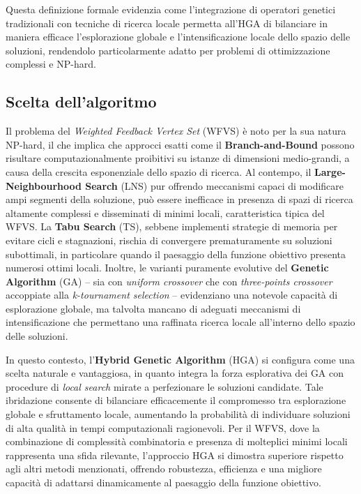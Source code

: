 \documentclass[12pt,a4paper,twoside]{article}
\begin{document}
\bigskip
Questa definizione formale evidenzia come l'integrazione di operatori genetici tradizionali con tecniche di ricerca locale permetta all'HGA di bilanciare in maniera efficace l'esplorazione globale e l'intensificazione locale dello spazio delle soluzioni, rendendolo particolarmente adatto per problemi di ottimizzazione complessi e NP-hard.
\subsection{Scelta dell'algoritmo}
Il problema del \emph{Weighted Feedback Vertex Set} (WFVS) è noto per la sua natura NP-hard, il che implica che approcci esatti come il \textbf{Branch-and-Bound} possono risultare computazionalmente proibitivi su istanze di dimensioni medio-grandi, a causa della crescita esponenziale dello spazio di ricerca. Al contempo, il \textbf{Large-Neighbourhood Search} (LNS) pur offrendo meccanismi capaci di modificare ampi segmenti della soluzione, può essere inefficace in presenza di spazi di ricerca altamente complessi e disseminati di minimi locali, caratteristica tipica del WFVS. La \textbf{Tabu Search} (TS), sebbene implementi strategie di memoria per evitare cicli e stagnazioni, rischia di convergere prematuramente su soluzioni subottimali, in particolare quando il paesaggio della funzione obiettivo presenta numerosi ottimi locali. Inoltre, le varianti puramente evolutive del \textbf{Genetic Algorithm} (GA) – sia con \emph{uniform crossover} che con \emph{three-points crossover} accoppiate alla \emph{k-tournament selection} – evidenziano una notevole capacità di esplorazione globale, ma talvolta mancano di adeguati meccanismi di intensificazione che permettano una raffinata ricerca locale all'interno dello spazio delle soluzioni. 

In questo contesto, l'\textbf{Hybrid Genetic Algorithm} (HGA) si configura come una scelta naturale e vantaggiosa, in quanto integra la forza esplorativa dei GA con procedure di \emph{local search} mirate a perfezionare le soluzioni candidate. Tale ibridazione consente di bilanciare efficacemente il compromesso tra esplorazione globale e sfruttamento locale, aumentando la probabilità di individuare soluzioni di alta qualità in tempi computazionali ragionevoli. Per il WFVS, dove la combinazione di complessità combinatoria e presenza di molteplici minimi locali rappresenta una sfida rilevante, l'approccio HGA si dimostra superiore rispetto agli altri metodi menzionati, offrendo robustezza, efficienza e una migliore capacità di adattarsi dinamicamente al paesaggio della funzione obiettivo.
\end{document}
